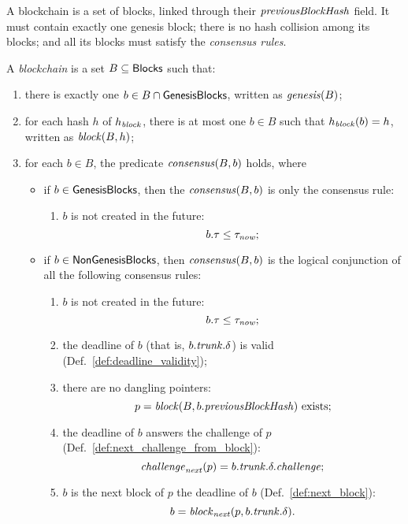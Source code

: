 A blockchain is a set of blocks, linked through their ${\mathit{previousBlockHash}}$ field.
It must contain exactly one genesis block; there is no hash collision among its blocks;
and all its blocks must satisfy the \emph{consensus rules}.
%
\begin{definition}\label{def:blockchain}
  A \emph{blockchain} is a set $B\subseteq{\mathsf{Blocks}}$ such that:
  \begin{enumerate}
  \item\label{prop:blockchain:genesis} there is exactly one $b\in B\cap{\mathsf{GenesisBlocks}}$, written as ${\mathit{genesis}}(B)$;
  \item\label{prop:blockchain:no_collision} for each hash $h$ of $h_{\mathit{block}}$, there is at most
    one $b\in B$ such that $h_{\mathit{block}}(b)=h$, written as ${\mathit{block}}(B,h)$;
  \item\label{prop:blockchain:consensus} for each $b\in B$, the predicate ${\mathit{consensus}}(B,b)$ holds, where
    \begin{itemize}
    \item if $b\in{\mathsf{GenesisBlocks}}$, then the ${\mathit{consensus}}(B,b)$ is only the consensus rule:
      \begin{enumerate}[label=(\alph*)]
      \item $b$ is not created in the future:
        \[
        b.\tau\le\tau_{\mathit{now}};
        \]
      \end{enumerate}
    \item if $b\in{\mathsf{NonGenesisBlocks}}$, then ${\mathit{consensus}}(B,b)$ is the logical conjunction
      of all the following consensus rules:
      \begin{enumerate}[label=(\alph*)]
      \item\label{prop:consensus:no_future} $b$ is not created in the future:
        \[
        b.\tau\le\tau_{\mathit{now}};
        \]
      \item\label{prop:consensus:valid} the deadline of $b$ (that is, $b.{\mathit{trunk}}.\delta$) is valid (Def.~\ref{def:deadline_validity});
      \item\label{prop:consensus:no_dangling} there are no dangling pointers:
        \[
        p={\mathit{block}}(B,b.{\mathit{previousBlockHash}})\text{ exists;}
        \]
      \item\label{prop:consensus:answer} the deadline of $b$ answers the challenge of $p$ (Def.~\ref{def:next_challenge_from_block}):
        \[
        {\mathit{challenge}}_{\mathit{next}}(p)=b.{\mathit{trunk}}.\delta.{\mathit{challenge}};
        \]
      \item\label{prop:consensus:next_block} $b$ is the next block of $p$ \wrt the deadline of $b$ (Def.~\ref{def:next_block}):
        \[
        b={\mathit{block}}_{\mathit{next}}(p,b.{\mathit{trunk}}.\delta).
        \]
      \end{enumerate}
    \end{itemize}
  \end{enumerate}
\end{definition}
